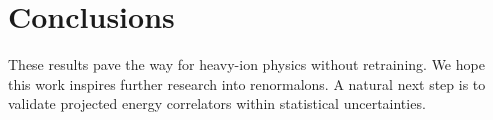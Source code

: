 \section{Conclusions}\label{sec:conclusions}

These results pave the way for heavy-ion physics without retraining. We
hope this work inspires further research into renormalons. A natural
next step is to validate projected energy correlators within statistical
uncertainties.

